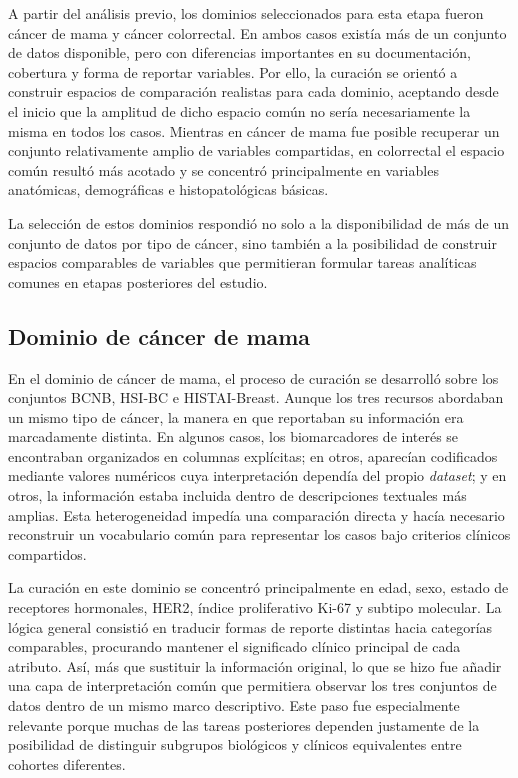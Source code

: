A partir del análisis previo, los dominios seleccionados para esta etapa fueron cáncer de mama y cáncer colorrectal. En ambos casos existía más de un conjunto de datos disponible, pero con diferencias importantes en su documentación, cobertura y forma de reportar variables. Por ello, la curación se orientó a construir espacios de comparación realistas para cada dominio, aceptando desde el inicio que la amplitud de dicho espacio común no sería necesariamente la misma en todos los casos. Mientras en cáncer de mama fue posible recuperar un conjunto relativamente amplio de variables compartidas, en colorrectal el espacio común resultó más acotado y se concentró principalmente en variables anatómicas, demográficas e histopatológicas básicas.

La selección de estos dominios respondió no solo a la disponibilidad de más de un conjunto de datos por tipo de cáncer, sino también a la posibilidad de construir espacios comparables de variables que permitieran formular tareas analíticas comunes en etapas posteriores del estudio.

\subsection{Dominio de cáncer de mama}

En el dominio de cáncer de mama, el proceso de curación se desarrolló sobre los conjuntos BCNB, HSI-BC e HISTAI-Breast. Aunque los tres recursos abordaban un mismo tipo de cáncer, la manera en que reportaban su información era marcadamente distinta. En algunos casos, los biomarcadores de interés se encontraban organizados en columnas explícitas; en otros, aparecían codificados mediante valores numéricos cuya interpretación dependía del propio \textit{dataset}; y en otros, la información estaba incluida dentro de descripciones textuales más amplias. Esta heterogeneidad impedía una comparación directa y hacía necesario reconstruir un vocabulario común para representar los casos bajo criterios clínicos compartidos.

La curación en este dominio se concentró principalmente en edad, sexo, estado de receptores hormonales, HER2, índice proliferativo Ki-67 y subtipo molecular. La lógica general consistió en traducir formas de reporte distintas hacia categorías comparables, procurando mantener el significado clínico principal de cada atributo. Así, más que sustituir la información original, lo que se hizo fue añadir una capa de interpretación común que permitiera observar los tres conjuntos de datos dentro de un mismo marco descriptivo. Este paso fue especialmente relevante porque muchas de las tareas posteriores dependen justamente de la posibilidad de distinguir subgrupos biológicos y clínicos equivalentes entre cohortes diferentes.

